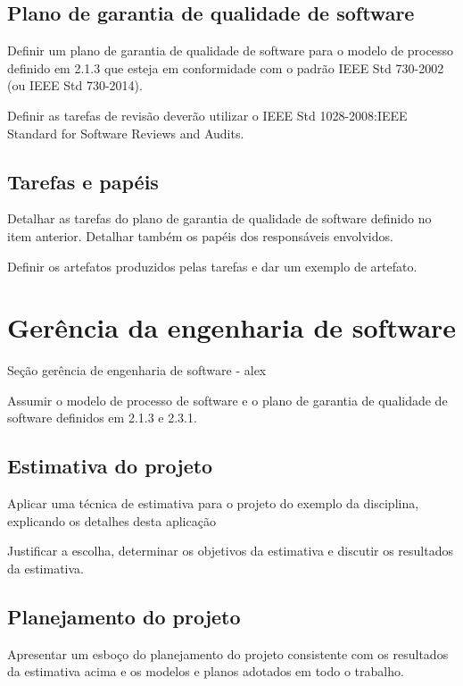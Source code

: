 \subsection{Plano de garantia de qualidade de software}

Definir um plano de garantia de qualidade de software para
o modelo de processo definido em 2.1.3 que esteja em
conformidade com o padrão IEEE Std 730-2002 (ou IEEE
Std 730-2014).

Definir as tarefas de revisão deverão utilizar o IEEE Std
1028-2008:IEEE Standard for Software Reviews and Audits.

\subsection{Tarefas e papéis}

Detalhar as tarefas do plano de garantia de qualidade de
software definido no item anterior. Detalhar também os
papéis dos responsáveis envolvidos.

Definir os artefatos produzidos pelas tarefas e dar um
exemplo de artefato.



\section{Gerência da engenharia de software}
\label{sec:gerenciaengenharia}

\large{Seção gerência de engenharia de software - alex}

Assumir o modelo de processo de software e o plano de garantia
de qualidade de software definidos em 2.1.3 e 2.3.1.

\subsection{Estimativa do projeto}

Aplicar uma técnica de estimativa para o projeto do
exemplo da disciplina, explicando os detalhes desta
aplicação

Justificar a escolha, determinar os objetivos da estimativa e
discutir os resultados da estimativa.

\subsection{Planejamento do projeto}

Apresentar um esboço do planejamento do projeto
consistente com os resultados da estimativa acima e os
modelos e planos adotados em todo o trabalho.



